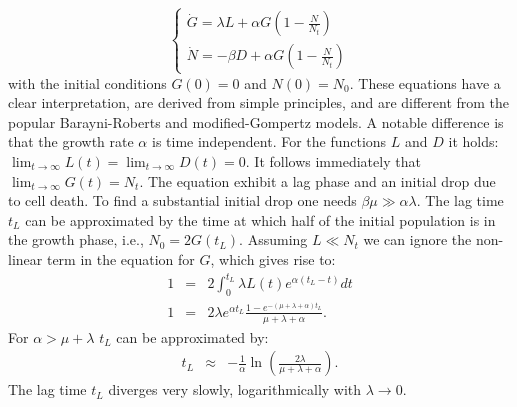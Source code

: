 \documentclass[10pt,A4paper]{article}
\begin{document}
\begin{equation}
    \begin{cases}
        \dot{G} = \lambda L + \alpha G\left(1-\frac{N}{N_t}\right)\\
        \dot{N} = - \beta D + \alpha G\left(1-\frac{N}{N_t}\right)
    \end{cases}
\end{equation}
with the initial conditions $G(0)=0$ and $N(0)=N_0$. 
These equations have a clear interpretation, are derived from simple principles, and are different from the popular Barayni-Roberts and modified-Gompertz models. 
A notable difference is that the growth rate $\alpha$ is time independent. 
For the functions $L$ and $D$ it holds: $\lim_{t\to\infty} L(t) = \lim_{t\to\infty} D(t) = 0$. 
It follows immediately that $\lim_{t\to\infty} G(t) = N_t$. 
The equation exhibit a lag phase and an initial drop due to cell death. 
To find a substantial initial drop one needs $\beta \mu \gg \alpha \lambda$. 
The lag time $t_L$ can be approximated by the time at which half of the initial population is in the growth phase, i.e., $N_0=2G(t_L)$. 
Assuming $L\ll N_t$ we can ignore the non-linear term in the equation for $G$, which gives rise to:
\begin{eqnarray}
    1&=& 2\int_0^{t_L} \lambda L(t)e^{\alpha(t_L-t)}dt\\
    1  &=& 2\lambda e^{\alpha t_L}\frac{1-e^{-(\mu+\lambda+\alpha)t_L}}{\mu+\lambda+\alpha}.
\end{eqnarray}
For $\alpha > \mu+\lambda$ $t_L$ can be approximated by:
\begin{eqnarray}
    t_L &\approx& -\frac{1}{\alpha}\ln\left(\frac{2\lambda}{\mu+\lambda+\alpha}\right).
\end{eqnarray}
The lag time $t_L$ diverges very slowly, logarithmically with $\lambda\to 0$.
%
%
%
\end{document}
